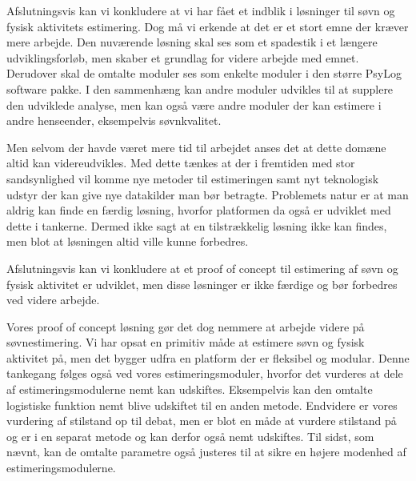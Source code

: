 Afslutningsvis kan vi konkludere at vi har fået et indblik i løsninger til søvn og fysisk aktivitets estimering.
Dog må vi erkende at det er et stort emne der kræver mere arbejde.
Den nuværende løsning skal ses som et spadestik i et længere udviklingsforløb, men skaber et grundlag for videre arbejde med emnet.
Derudover skal de omtalte moduler ses som enkelte moduler i den større PsyLog software pakke.
I den sammenhæng kan andre moduler udvikles til at supplere den udviklede analyse, men kan også være andre moduler der kan estimere i andre henseender, eksempelvis søvnkvalitet.


Men selvom der havde været mere tid til arbejdet anses det at dette domæne altid kan videreudvikles.
Med dette tænkes at der i fremtiden med stor sandsynlighed vil komme nye metoder til estimeringen samt nyt teknologisk udstyr der kan give nye datakilder man bør betragte.
Problemets natur er at man aldrig kan finde en færdig løsning, hvorfor platformen da også er udviklet med dette i tankerne.
Dermed ikke sagt at en tilstrækkelig løsning ikke kan findes, men blot at løsningen altid ville kunne forbedres.

Afslutningsvis kan vi konkludere at et proof of concept til estimering af søvn og fysisk aktivitet er udviklet, men disse løsninger er ikke færdige og bør forbedres ved videre arbejde.

Vores proof of concept løsning gør det dog nemmere at arbejde videre på søvnestimering.
Vi har opsat en primitiv måde at estimere søvn og fysisk aktivitet på, men det bygger udfra en platform der er fleksibel og modular.
Denne tankegang følges også ved vores estimeringsmoduler, hvorfor det vurderes at dele af estimeringsmodulerne nemt kan udskiftes.
Eksempelvis kan den omtalte logistiske funktion nemt blive udskiftet til en anden metode.
Endvidere er vores vurdering af stilstand op til debat, men er blot en måde at vurdere stilstand på og er i en separat metode og kan derfor også nemt udskiftes. 
Til sidst, som nævnt, kan de omtalte parametre også justeres til at sikre en højere modenhed af estimeringsmodulerne.




